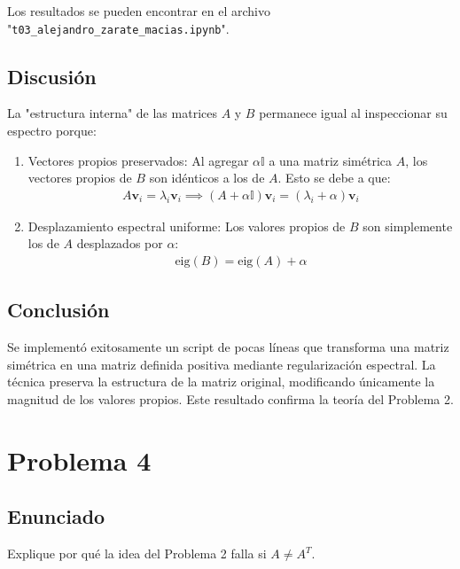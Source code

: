 \documentclass{article}
\begin{document}
Los resultados se pueden encontrar en el archivo "\texttt{t03\_alejandro\_zarate\_macias.ipynb}".

\subsection{Discusión}

La "estructura interna" de las matrices $A$ y $B$ permanece igual al inspeccionar su espectro porque:

\begin{enumerate}
    \item Vectores propios preservados: Al agregar $\alpha \mathbb{I}$ a una matriz simétrica $A$, los vectores propios de $B$ son idénticos a los de $A$. Esto se debe a que:
    \begin{align}
    A\mathbf{v}_i = \lambda_i \mathbf{v}_i \implies (A + \alpha \mathbb{I})\mathbf{v}_i = (\lambda_i + \alpha)\mathbf{v}_i
    \end{align}
    
    \item Desplazamiento espectral uniforme: Los valores propios de $B$ son simplemente los de $A$ desplazados por $\alpha$:
    \begin{align}
    \text{eig}(B) = \text{eig}(A) + \alpha
    \end{align}
    
\end{enumerate}

\subsection{Conclusión}

Se implementó exitosamente un script de pocas líneas que transforma una matriz simétrica en una matriz definida positiva mediante regularización espectral. La técnica preserva la estructura de la matriz original, modificando únicamente la magnitud de los valores propios. Este resultado confirma la teoría del Problema 2.

\section{Problema 4}

\subsection{Enunciado}
Explique por qué la idea del Problema 2 falla si $A \neq A^T$.
\end{document}
